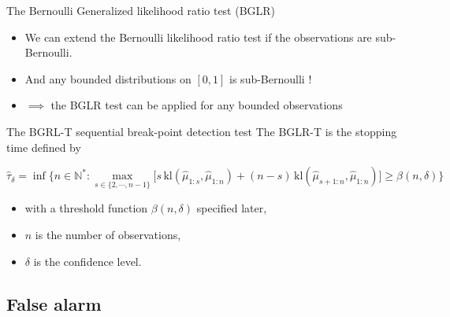 \documentclass[11pt,english,ignorenonframetext,]{beamer}
\providecommand{\tightlist}{%
  \setlength{\itemsep}{0pt}\setlength{\parskip}{0pt}}
\begin{document}
\begin{frame}{The Bernoulli Generalized likelihood ratio test (BGLR)}

  \begin{itemize}
    \item
    We can extend the Bernoulli likelihood ratio test if the observations are \alert{sub-Bernoulli}.
    \item
    And any bounded distributions on $[0,1]$ is sub-Bernoulli !
    \item
    $\implies$ the BGLR test can be applied for any bounded observations \dCooley{}
  \end{itemize}


  \pause

  \begin{block}{The BGRL-T sequential break-point detection test}
    The \alert{BGLR-T} is the stopping time defined by
    \begin{small}
    \[ \widehat{\tau}_{\delta} = \inf \bigl\{ n \in \mathbb{N}^* : \max_{s \in \{2,\cdots,n-1\}} \bigl[s \, \mathrm{kl}\left(\widehat{\mu}_{1:s},\widehat{\mu}_{1:n}\right) + (n-s) \, \mathrm{kl}\left(\widehat{\mu}_{s+1:n},\widehat{\mu}_{1:n}\right)\bigr] \geq \beta(n,\delta) \bigr\} \]
    \vspace*{-10pt}
    \end{small}%
    \begin{itemize}\tightlist
      \item with a \alert{threshold function} $\beta(n,\delta)$ specified later,
      \item $n$ is the number of observations,
      \item $\delta$ is the confidence level.
    \end{itemize}%
  \end{block}

\end{frame}


\subsection{\hfill{}False alarm\hfill{}}
\end{document}
